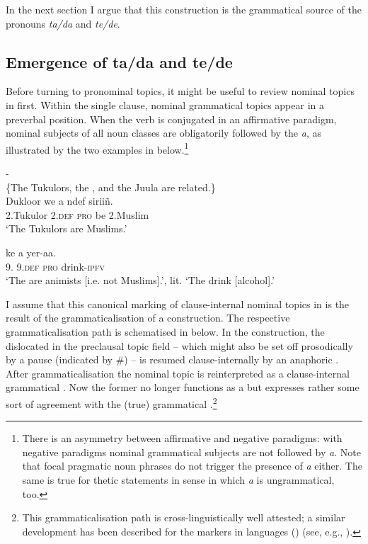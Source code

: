 \documentclass[output=paper,newtxmath,modfonts,nonflat,hidelinks]{langsci/langscibook}
\begin{document}
In the next section I argue that this construction is the grammatical source of the pronouns \textit{ta/da} and \textit{te/de}.

\subsection{Emergence of ta/da and te/de}\label{sec:apel:2.2}

Before turning to pronominal  topics, it might be useful to review nominal  topics in  first. Within the single clause, nominal grammatical  topics appear in a preverbal position. When the verb is conjugated in an affirmative paradigm, nominal subjects of all noun classes are obligatorily followed by the  \textit{a}, as illustrated by the two examples in  below.\footnote{There is an asymmetry between affirmative and negative paradigms: with negative paradigms nominal grammatical subjects are not followed by \textit{a}. Note that focal pragmatic  noun phrases do not trigger the presence of \textit{a} either. The same is true for thetic statements in  sense in which \textit{a} is ungrammatical, too.}

\ea\label{ex:apel:12}{- \citep[289]{Faye1979}}\\
\{The Tukulors, the , and the Juula are related.\}\\
\ea\label{ex:apel:12a}
\gll Dukloor we a ndef siriiñ.\\
     \textsc{2.}Tukulor \textsc{2.def} \textsc{pro} be \textsc{2.}Muslim\\
\glt ‘The Tukulors are Muslims.’

\ex\label{ex:apel:12b}
\gll {} ke a yer-aa.\\
     \textsc{9.} \textsc{9.def} \textsc{pro} drink\textsc{-ipfv}\\
\glt ‘The  are animists [i.e. not Muslims].’, lit. ‘The  drink [alcohol].’
\z
\z

I assume that this canonical marking of clause-internal nominal  topics in  is the result of the grammaticalisation of a  construction. The respective grammaticalisation path is schematised in  below. In the  construction, the dislocated  in the preclausal topic field -- which might also be set off prosodically by a pause (indicated by \#) -- is resumed clause-internally by an anaphoric . After grammaticalisation the nominal topic is reinterpreted as a clause-internal grammatical . Now the former  no longer functions as a  but expresses rather some sort of agreement with the (true) grammatical .\footnote{This grammaticalisation path is cross-linguistically well attested; a similar development has been described for the  markers in  languages () (see, e.g., \citealt{Morimoto2008}).}
\end{document}
